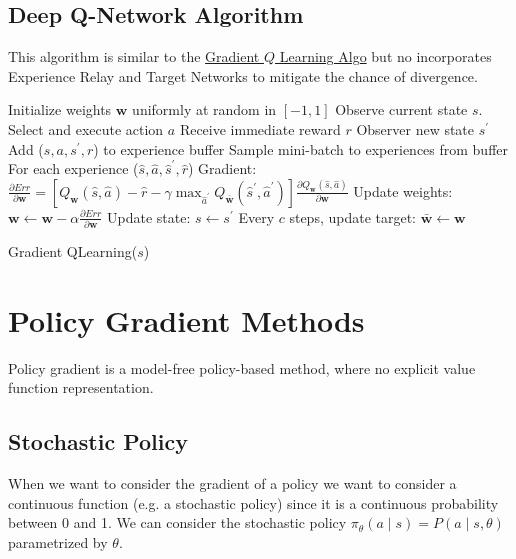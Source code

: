 \documentclass[12pt]{article}
\begin{document}
        \subsection{Deep Q-Network Algorithm}
            This algorithm is similar to the \hyperref[GradientQLearningAlgo]{Gradient $Q$ Learning Algo} but no
            incorporates Experience Relay and Target Networks to mitigate the chance of divergence. 

            \begin{algorithm}[H] \label{DeepQLearning}
                \SetAlgoLined
                Initialize weights $\boldsymbol{w}$ uniformly at random in $[-1,1]$
                Observe current state $s$.
                 {
                    Select and execute action $a$ \;
                    Receive immediate reward $r$ \;
                    Observer new state $s^{\prime}$ \;
                    Add ($s, a, s^{\prime}, r$) to experience buffer \;
                    Sample mini-batch to experiences from buffer \;
                    For each experience ($\hat{s}, \hat{a}, \hat{s}^{\prime}, \hat{r}$) \;
                        \Indp
                        Gradient: $\frac{\partial Err}{\partial \boldsymbol{w}}=\left[Q_{\boldsymbol{w}}(\hat{s}, \hat{a})-\hat{r}-\gamma \max _{\hat{a}^{\prime}}
                        Q_{\bar{\boldsymbol{w}}}\left(\hat{s}^{\prime}, \hat{a}^{\prime}\right)\right] \frac{\partial Q_{\boldsymbol{w}}(\hat{s},
                        \hat{a})}{\partial \boldsymbol{w}}$ \;
                        Update weights: $\boldsymbol{w} \gets \boldsymbol{w} - \alpha \frac{\partial Err}{\partial
                        \boldsymbol{w}}$ \;
                        \Indm
                    Update state: $ s \gets s^{\prime} $
                    Every $c$ steps, update target: $\bar{\boldsymbol{w}} \gets \boldsymbol{w}$
                }
                \caption{Gradient QLearning($s$)}
            \end{algorithm}
    
\section{Policy Gradient Methods}
    Policy gradient is a model-free policy-based method, where no explicit value function representation.

    \subsection{Stochastic Policy}
        When we want to consider the gradient of a policy we want to consider a continuous function (e.g. a stochastic
        policy) since it is a continuous probability between 0 and 1. We can consider the stochastic policy
        $\pi_{\theta}(a \mid s) = P(a \mid s, \theta)$ parametrized by $\theta$.
\end{document}
